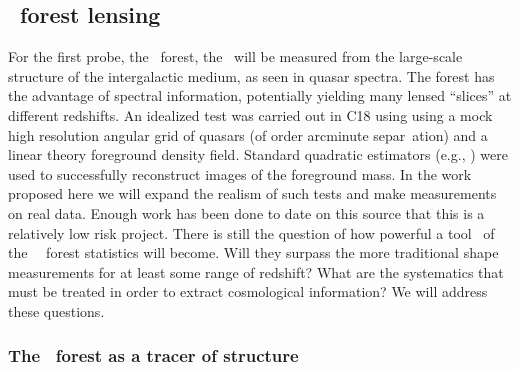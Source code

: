 \subsection{\lya\ forest lensing}


For the first probe, the \lya\ forest,  the \atf\ will be measured
from the large-scale structure of the intergalactic medium, as 
seen in quasar spectra.  
The forest has the advantage of spectral information,
potentially yielding many lensed ``slices'' at different redshifts.
An idealized test was carried out in C18 using using a mock high
resolution angular grid of quasars (of order arcminute separ\ ation)
and a linear theory foreground density field. Standard quadratic
estimators (e.g., \citealt{okamoto}) were used to successfully
reconstruct images of the foreground mass. In the work
proposed here we will expand the realism of such tests and make
measurements on real data. Enough work has been done to  date on this
source that this is a relatively low risk project. There is still the
question of how powerful a tool \atf\ of the \lya\ \ forest statistics
will become. Will they surpass the more traditional shape
measurements for at least some range of redshift? What are the
systematics that must be treated in order to extract cosmological
information? We will address these
questions.


\subsubsection{The \lya\ forest as a tracer of structure}

